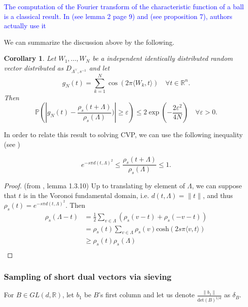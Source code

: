 \documentclass{article}
\newif\ifshowcomments
\DeclareRobustCommand{\TN}[1]{%
  \ifshowcomments
    {\color{orange} [TN][#1]}%
  \fi
}
\newtheorem{corollary}{Corollary}[theorem]
\begin{document}
\textcolor{blue}{The computation of the Fourier transform of the characteristic function of a ball is a classical result. In \cite{ducas2023accurate} (see lemma 2 page 9) and \cite{carrier2024reduction} (see proposition 7), authors actually use it  }   

We can summarize the discussion above by the following.

\begin{corollary}
Let $W_1,\ldots , W_N$ be a independent identically distributed random vector distributed as $D_{\Lambda^\vee , s^{-1}}$ and let
\[g_N(t) = \sum_{k=1}^N\cos(2\pi \langle W_k,t\rangle )\quad\forall t\in\mathbb R^n.\] 
Then 
\[\mathbb P( |g_N(t) - \frac{\rho_s(t+\Lambda)}{\rho_s(\Lambda)}) |\geq \varepsilon ) \leq  2 \exp( - \frac{2\varepsilon^2}{4N}) \quad \forall \varepsilon >0.\]
\end{corollary}

In order to relate this result to solving CVP, we can use the following inequality (see \cite{banaszczyk1993new}) \TN{Ecrire explicitement ce que ça fournirait comme estimation.} 
\[ e^{-s\pi d(t,\Lambda)^2} \leq \frac{\rho_s(t+\Lambda)}{\rho_s(\Lambda)}\leq 1. \]
\begin{proof}(from \cite{stephens2017gaussian}, lemma 1.3.10)
Up to translating by element of $\Lambda$, we can suppose that $t$ is in the Voronoi fundamental domain, i.e. $d(t,\Lambda) = \|t\|$, and thus $\rho_s(t)= e^{-s\pi d(t,\Lambda)^2}$. Then 
\[\begin{split}
\rho_s(\Lambda - t ) &= \frac{1}{2}\sum_{v\in \Lambda} ( \rho_s(v-t) + \rho_s(-v-t)) \\
	& = \rho_s(t) \sum_{v\in \Lambda}\rho_s(v) \text{cosh}(2s\pi\langle v,t\rangle)\\
	& \geq  \rho_s(t)\rho_s(\Lambda) \\ 
\end{split}\]
\end{proof}

\subsubsection{Sampling of short dual vectors via sieving}

For $B\in GL(d,\mathbb R)$, let $b_1$ be $B$'s first column and let us denote $\frac{\|b_1\|}{\text{det}(B)^{1/d}}$ as $\delta_B$.\\
\end{document}
